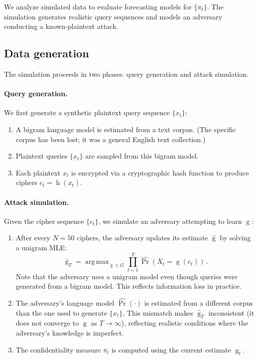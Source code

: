 \documentclass[final,11pt]{article}
\newcommand{\argmax}{\operatorname{arg\,max}}
\theoremstyle{plain}
\theoremstyle{remark}
\begin{document}
We analyze simulated data to evaluate forecasting models for $\{\pi_t\}$.
The simulation generates realistic query sequences and models an adversary
conducting a known-plaintext attack.

\subsection{Data generation}

The simulation proceeds in two phases: query generation and attack simulation.

\paragraph{Query generation.}
We first generate a synthetic plaintext query sequence $\{x_t\}$:
\begin{enumerate}
\item A bigram language model is estimated from a text corpus. (The specific
corpus has been lost; it was a general English text collection.)
\item Plaintext queries $\{x_t\}$ are sampled from this bigram model.
\item Each plaintext $x_t$ is encrypted via a cryptographic hash function
to produce ciphers $c_t = \operatorname{h}(x_t)$.
\end{enumerate}

\paragraph{Attack simulation.}
Given the cipher sequence $\{c_t\}$, we simulate an adversary attempting
to learn $\operatorname{g}$:
\begin{enumerate}
\item After every $N=50$ ciphers, the adversary updates its estimate
$\hat{\operatorname{g}}$ by solving a unigram MLE:
$$
    \hat{\operatorname{g}}_T = \argmax_{\operatorname{g} \in G}
    \prod_{t=1}^{T} \hat{\Pr}(X_t = \operatorname{g}(c_t))\,.
$$
Note that the adversary uses a unigram model even though queries were
generated from a bigram model. This reflects information loss in practice.
\item The adversary's language model $\hat{\Pr}(\cdot)$ is estimated from
a different corpus than the one used to generate $\{x_t\}$. This mismatch
makes $\hat{\operatorname{g}}_T$ inconsistent (it does not converge to
$\operatorname{g}$ as $T \to \infty$), reflecting realistic conditions
where the adversary's knowledge is imperfect.
\item The confidentiality measure $\pi_t$ is computed using the current
estimate $\hat{\operatorname{g}}_t$.
\end{enumerate}
\end{document}
